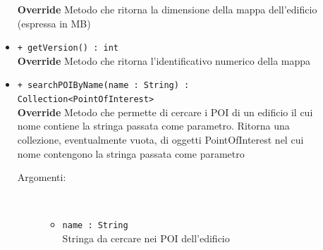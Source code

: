 \documentclass[../DefinizioneDiProdotto.tex]{subfiles}
\begin{document}
\begin{description}
\begin{itemize}
		\textbf{Override} Metodo che ritorna la dimensione della mappa dell'edificio (espressa in MB)
		\item \texttt{+ getVersion() : int}\\
		\textbf{Override} Metodo che ritorna l'identificativo numerico della mappa
		\item \texttt{+ searchPOIByName(name : String) : Collection<PointOfInterest>}\\
		\textbf{Override} Metodo che permette di cercare i POI di un edificio il cui nome contiene la stringa passata come parametro. Ritorna una collezione, eventualmente vuota,  di oggetti PointOfInterest nel cui nome contengono la stringa passata come parametro
		\begin{description}
			\item[Argomenti:] \
			\begin{itemize}
				\item \texttt{name : String}\\
				Stringa da cercare nei POI dell'edificio\end{itemize}
		\end{description}
	\end{itemize}
\end{description}
\end{document}
